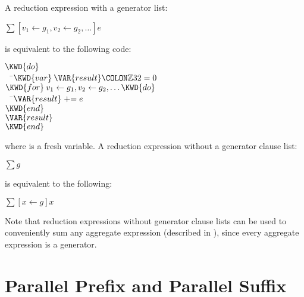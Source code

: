 A reduction expression with a generator list:
\begin{Fortress}
\(\sum [v_{\mathrm{1}} \gets g_{\mathrm{1}}, v_{\mathrm{2}} \gets g_{\mathrm{2}}, \ldots] e\)
\end{Fortress}
is equivalent to the following code:
\begin{Fortress}
\(\KWD{do}\)\\
{\tt~~}\pushtabs\=\+\(  \KWD{var}\:\VAR{result}\COLON \mathbb{Z}32 = 0\)\\
\(  \KWD{for}\:v_{1} \leftarrow g_{1}, v_{2} \leftarrow g_{2}, \ldots \KWD{do}\)\\
{\tt~~}\pushtabs\=\+\(    \VAR{result} \mathrel{+}= e\)\-\\\poptabs
\(  \KWD{end}\)\\
\(  \VAR{result}\)\-\\\poptabs
\(\KWD{end}\)
\end{Fortress}
where  is a fresh variable.
%
A reduction expression without a generator clause list:
\begin{Fortress}
\(\sum g\)
\end{Fortress}
is equivalent to the following:
\begin{Fortress}
\(\sum [x \gets g] x\)
\end{Fortress}
Note that reduction expressions without generator clause lists can be used to
conveniently sum any aggregate expression (described in
), since every aggregate expression
is a generator.

\section{Parallel Prefix and Parallel Suffix}
